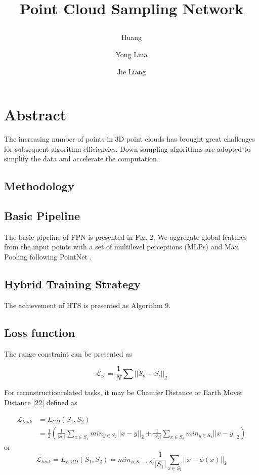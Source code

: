 \documentclass{article}
\title{
\raggedright{Point Cloud Sampling Network}\\
}
\author[a]{\raggedright{Huang}}
\author[a,*]{\raggedright{Yong Liua}}
\author[a,b]{\raggedright{Jie Liang}}
\affil[a]{\raggedright{Laboratory of Advanced Perception on Robotics and Intelligent Learning, College of Control Science and Engineering, Zhejiang University, Hangzhou, China}}
\affil[b]{\raggedright{Institute of Mechanical and Electrical Engineering, Beijing, China}}
\date{}
\begin{document}
\maketitle
\section{Abstract}
The increasing number of points in 3D point clouds has brought great challenges for subsequent algorithm efficiencies. Down-sampling algorithms are adopted to simplify the data and accelerate the computation.

\begin{multicols}{2}
\section{Methodology}
\subsection{Basic Pipeline}
The basic pipeline of FPN is presented in Fig. 2. We aggregate global features from the input points with a set of multilevel perceptions (MLPs) and Max Pooling following
PointNet .

\subsection{Hybrid Training Strategy}
The achievement of HTS is presented as Algorithm 9.

\subsection{Loss function}
The range constraint can be presented as 

\begin{equation}
    \mathcal{L}_{rc} = \frac{1}{N} \sum{||S_{o} - S_{i}||_{2}}
\end{equation}

For reconstructionrelated tasks, it may be Chamfer Distance or Earth Mover Distance [22] defined as

\begin{equation}
\begin{split}
    \mathcal{L}_{task} &= L_{CD}(S_1,S_2) \\
        &= \frac{1}{2} \left( \frac{1}{|S_1|} \sum_{x\in S_1} min_{y \in S_2}||x-y||_2 + \frac{1}{|S_2|} \sum_{x \in S_2} min_{y \in S_2 } ||x-y||_2 \right)
\end{split}
\end{equation}
or
\begin{equation}
     \mathcal{L}_{task} = L_{EMD}(S_1,S_2) = min_{\phi ; S_1 \rightarrow S_2} \frac{1}{|S_1|} \sum_{x \in S_1} ||x-\phi(x)||_2
\end{equation}
    
\end{multicols}
\end{document}
